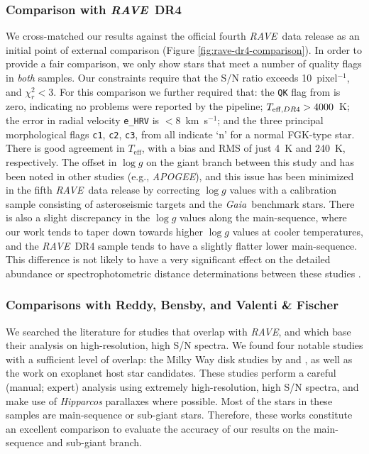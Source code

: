 \documentclass[preprint]{aastex}
\newcommand{\acronym}[1]{{\small{#1}}}
\newcommand{\project}[1]{\textsl{#1}}
\newcommand{\gaia}{\project{Gaia}}
\newcommand{\rave}{\project{\acronym{RAVE}}}
\newcommand{\apogee}{\project{\acronym{APOGEE}}}
\newcommand{\teff}{T_{\mathrm{eff}}}
\newcommand{\logg}{\log g}
\begin{document}
\subsubsection{Comparison with \rave\ DR4}
\label{sec:validation-kordopatis}

We cross-matched our results against the official fourth \rave\ data release 
as an initial point of external comparison (Figure \ref{fig:rave-dr4-comparison}).
In order to provide a fair comparison, we only show stars that meet a number
of quality flags in \emph{both} samples.  Our constraints require that the
S/N ratio exceeds 10~pixel$^{-1}$, and $\chi_r^2 < 3$.  For this comparison
we further required that:
the \texttt{QK} flag from \citet{Kordopatis_2013} is zero, indicating no
problems were reported by the pipeline; $T_{{\rm eff},DR4} > 4000$~K;
the error in radial velocity \texttt{e\_HRV} is $<$8~km~s$^{-1}$; and the three
principal morphological flags \texttt{c1}, \texttt{c2}, \texttt{c3}, from 
\citet{Matijevic_2012} all indicate `n' for a normal FGK-type star.
There is good agreement in $\teff$, with a bias and RMS of just 4~K and 240~K,
respectively. The offset in $\logg$ on the giant branch between this study and 
\citet{Kordopatis_2013} has been noted in other studies (e.g., \apogee), and this issue
has been minimized in the fifth \rave\ data release by correcting $\logg$
values with a calibration sample consisting of asteroseismic targets and the
\gaia\ benchmark stars.  There is also a
slight discrepancy in the $\logg$ values along the main-sequence, where our
work tends to taper down towards higher $\logg$ values at cooler temperatures,
and the \rave\ DR4 sample tends to have a slightly flatter lower main-sequence.
This difference is not likely to have a very significant effect on the detailed
abundance or spectrophotometric distance determinations between these studies 
\citep{Binney_2014}.


\subsubsection{Comparisons with Reddy, Bensby, and Valenti \& Fischer}
\label{sec:validation-gold-standards}


We searched the literature for studies that overlap with \rave, and which base
their analysis on high-resolution, high S/N spectra.  We found four notable
studies with a sufficient level of overlap: the Milky Way disk studies by 
\citet{Reddy_2003,Reddy_2006} and \citet{Bensby_2014}, as well as the 
\citet{Valenti_Fischer_2005} work on exoplanet host star candidates.  These 
studies perform a careful (manual; expert) analysis using extremely 
high-resolution, high S/N spectra, and make use of \project{Hipparcos} 
parallaxes where possible.  Most of the stars in these samples are 
main-sequence or sub-giant stars.  Therefore, these works constitute an 
excellent comparison to evaluate the accuracy of our results on the 
main-sequence and sub-giant branch.
\end{document}
